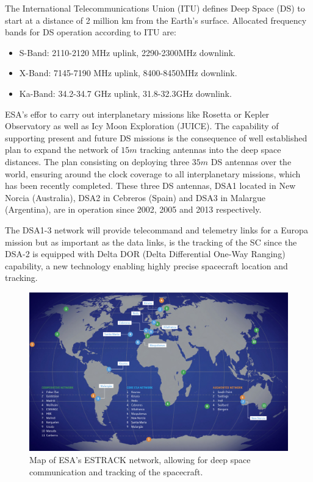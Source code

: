 
The International Telecommunications Union (ITU) defines Deep Space (DS) to start at a distance of 2 million km from the Earth's surface. Allocated frequency bands for DS operation according to ITU are:

\begin{itemize}
    \item S-Band: 2110-2120 MHz uplink, 2290-2300MHz downlink.
    \item X-Band: 7145-7190 MHz uplink, 8400-8450MHz downlink.
    \item Ka-Band: 34.2-34.7 GHz uplink, 31.8-32.3GHz downlink.
\end{itemize}

\noindent
ESA's effor to carry out interplanetary missions like Rosetta or Kepler Observatory as well as Icy Moon Exploration (JUICE). The capability of supporting present and future DS missions is the consequence of well established plan to expand the network of $15m$ tracking antennas into the deep space distances. The plan consisting on deploying three $35m$ DS antennas over the world, ensuring around the clock coverage to all interplanetary missions, which has been recently completed. These three DS antennas, DSA1 located in New Norcia (Australia), DSA2 in Cebreros (Spain) and DSA3 in Malargue (Argentina), are in operation since 2002, 2005 and 2013 respectively.

The DSA1-3 network will provide telecommand and telemetry links for a Europa mission but as important as the data links, is the tracking of the SC since the DSA-2 is equipped with Delta DOR (Delta Differential One-Way Ranging) capability, a new technology enabling highly precise spacecraft location and tracking.

\begin{figure}[htb]
	\centering
	\includegraphics[width=\textwidth]{figures/comms/ESTRACK-map}
	\caption{Map of ESA's ESTRACK network, allowing for deep space communication and tracking of the spacecraft.}
	\label{fig:ESTRACK-map}
\end{figure}


